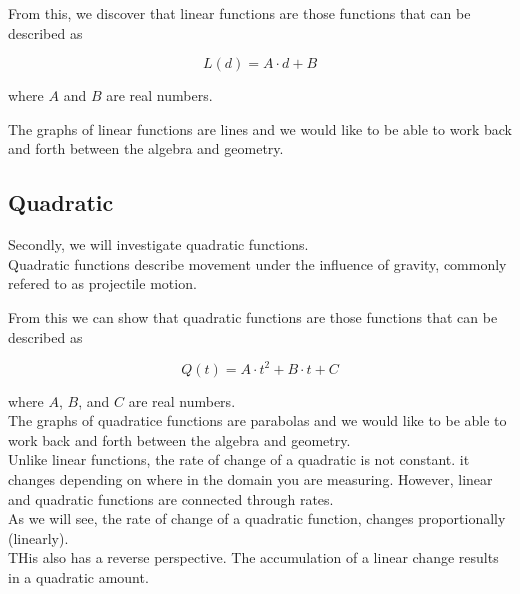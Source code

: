 \documentclass{ximera}
\begin{document}
From this, we discover that linear functions are those functions that can be described as

\[  L(d) = A \cdot d + B \]

where $A$ and $B$ are real numbers.


The graphs of linear functions are lines and we would like to be able to work back and forth between the algebra and geometry.













\subsection*{Quadratic}


Secondly, we will investigate quadratic functions. \\


Quadratic functions describe movement under the influence of gravity, commonly refered to as projectile motion. 





From this we can show that quadratic functions are those functions that can be described as

\[  Q(t) = A \cdot t^2 + B \cdot t + C \]

where $A$, $B$, and $C$ are real numbers. \\



The graphs of quadratice functions are parabolas and we would like to be able to work back and forth between the algebra and geometry. \\



Unlike linear functions, the rate of change of a quadratic is not constant. it changes depending on where in the domain you are measuring.  However, linear and quadratic functions are connected through rates. \\

As we will see, the rate of change of a quadratic function, changes proportionally (linearly). \\


THis also has a reverse perspective.  The accumulation of a linear change results in a quadratic amount.
\end{document}
